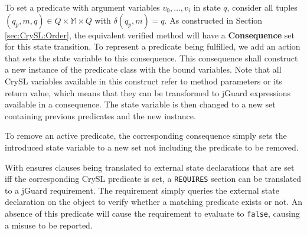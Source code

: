 \documentclass{article}
\begin{document}
To set a predicate with argument variables $v_0, \ldots, v_i$ in state $q$, consider all tuples
$(q_p, m, q) \in Q \times \mathbb{M} \times Q$ with $\delta(q_p, m) = q$.
As constructed in Section \ref{sec:CrySL:Order}, the equivalent verified method will have a \textbf{Consequence} set for this state
transition.
To represent a predicate being fulfilled, we add an action that sets the state variable to this consequence.
This consequence shall construct a new instance of the predicate class with the bound variables. Note that all CrySL
variables available in this construct refer to method parameters or its return value, which means that they can be
transformed to jGuard expressions available in a consequence.
The state variable is then changed to a new set containing previous predicates and the new instance.

To remove an active predicate, the corresponding consequence simply sets the introduced state variable
to a new set not including the predicate to be removed.

With ensures clauses being translated to external state declarations that are set iff the
corresponding CrySL predicate is set, a \texttt{REQUIRES} section can be translated to a jGuard requirement.
The requirement simply queries the external state declaration on the object to verify whether a matching
predicate exists or not.
An absence of this predicate will cause the requirement to evaluate to \texttt{false}, causing a misuse
to be reported.
\end{document}
